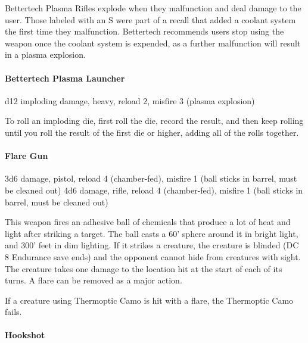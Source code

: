 \documentclass{article}
\begin{document}
Bettertech Plasma Rifles explode when they malfunction and deal damage to the user. Those labeled with an S were part of a recall that added a coolant system the first time they malfunction. Bettertech recommends users stop using the weapon once the coolant system is expended, as a further malfunction will result in a plasma explosion.%

\paragraph{Bettertech Plasma Launcher}\label{sec-bettertech-plasma-launcher}%

\noindent{}d12 imploding damage, heavy, reload 2, misfire 3 (plasma explosion)%

To roll an imploding die, first roll the die, record the result, and then keep rolling until you roll the result of the first die or higher, adding all of the rolls together. %

\paragraph{Flare Gun}\label{sec-flare-gun}%

\noindent{}3d6 damage, pistol, reload 4 (chamber-fed), misfire 1 (ball sticks in barrel, must be cleaned out)
4d6 damage, rifle, reload 4 (chamber-fed), misfire 1 (ball sticks in barrel, must be cleaned out)%

This weapon fires an adhesive ball of chemicals that produce a lot of heat and light after striking a target. The ball casts a 60' sphere around it in bright light, and 300' feet in dim lighting. If it strikes a creature, the creature is blinded (DC 8 Endurance save ends) and the opponent cannot hide from creatures with sight. The creature takes one damage to the location hit at the start of each of its turns. A flare can be removed as a major action.%

If a creature using Thermoptic Camo is hit with a flare, the Thermoptic Camo fails.%

\paragraph{Hookshot}\label{sec-hookshot}%
\end{document}

